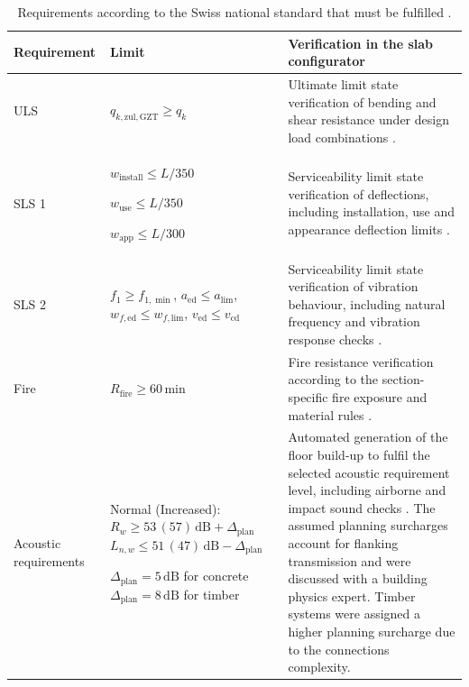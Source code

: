 \begin{table}[h]
    \centering
    \begingroup
    \scriptsize
    \caption{Requirements according to the Swiss national standard that must be fulfilled \cite{SIA181_2020, SIA260_2013}. \label{Tab: ReqSS}}
    \vspace{-0.5cm}
    \setlength{\tabcolsep}{4pt}
    \renewcommand{\arraystretch}{1.2}
    \begin{tabularx}{\textwidth}{@{}L{2.4cm}|L{3.8cm}|X@{}}
    \hline
    \textbf{Requirement} &
    \textbf{Limit} &
    \textbf{Verification in the slab configurator} \\ \hline

    ULS &
    $q_{k,\mathrm{zul,GZT}} \geq q_k$ &
    Ultimate limit state verification of bending and shear resistance under design load combinations \cite{SIA260_2013, SIA261_2020}. \\

    SLS 1 &
    $w_{\mathrm{install}} \leq L/350$
    
    $w_{\mathrm{use}} \leq L/350$
    
    $w_{\mathrm{app}} \leq L/300$ &
    Serviceability limit state verification of deflections, including installation, use and appearance deflection limits \cite{SIA260_2013, SIA261_2020}. \\

    SLS 2 &
    $f_1 \geq f_{1,\min}$, $a_{\mathrm{ed}} \leq a_{\mathrm{lim}}$, $w_{f,\mathrm{ed}} \leq w_{f,\mathrm{lim}}$, $v_{\mathrm{ed}} \leq v_{\mathrm{cd}}$ &
    Serviceability limit state verification of vibration behaviour, including natural frequency and vibration response checks \cite{Lignum3.1:2015, Ziegler2008Grundlagen}. \\

    Fire &
    $R_{\mathrm{fire}} \geq 60\,\mathrm{min}$ &
    Fire resistance verification according to the section-specific fire exposure and material rules \cite{SIA260_2013}. \\

        Acoustic requirements &
    Normal (Increased): $R_w \geq 53\,(57)\,\mathrm{dB}+\Delta_{\mathrm{plan}}$
    $L_{n,w} \leq 51\,(47)\,\mathrm{dB}-\Delta_{\mathrm{plan}}$
    
    $\Delta_{\mathrm{plan}}=5\,\mathrm{dB}$ for concrete
    $\Delta_{\mathrm{plan}}=8\,\mathrm{dB}$ for timber &
    Automated generation of the floor build-up to fulfil the selected acoustic requirement level, including airborne and impact sound checks \cite{SIA181_2020}. 
    The assumed planning surcharges account for flanking transmission and were discussed with a building physics expert. Timber systems were assigned a higher planning surcharge due to the connections complexity. \\ \hline
    \end{tabularx}
    \endgroup
\end{table}
